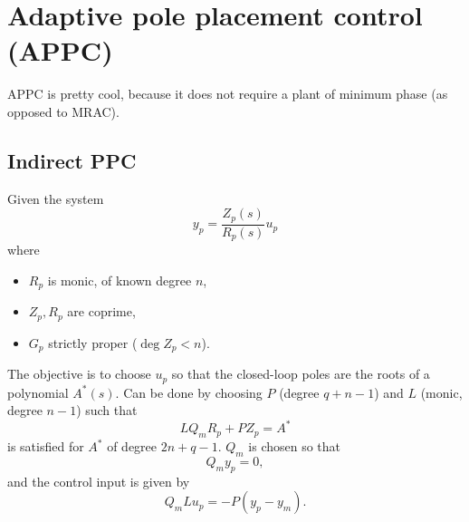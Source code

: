 \section{Adaptive pole placement control (APPC)}
APPC is pretty cool, because it does not require a plant of minimum phase (as opposed to MRAC).

\subsection{Indirect PPC}
Given the system
\begin{equation}
	y_p = \frac{Z_p(s)}{R_p(s)} u_p
\end{equation}
where
\begin{itemize}
	\item $R_p$ is monic, of known degree $n$,
	\item $Z_p, R_p$ are coprime,
	\item $G_p$ strictly proper ($\deg{Z_p} < n$).
\end{itemize}

The objective is to choose $u_p$ so that the closed-loop poles are the roots of a polynomial $A^*(s)$. Can be done by choosing $P$ (degree $q+n-1$) and $L$ (monic, degree $n-1$) such that
\begin{equation}
	L Q_m R_p + P Z_p = A^*
\end{equation}
is satisfied for $A^*$ of degree $2n+q-1$. $Q_m$ is chosen so that
\begin{equation}
	Q_m y_p = 0,
\end{equation}
and the control input is given by
\begin{equation}
	Q_m L u_p = -P (y_p - y_m)
	.
\end{equation}